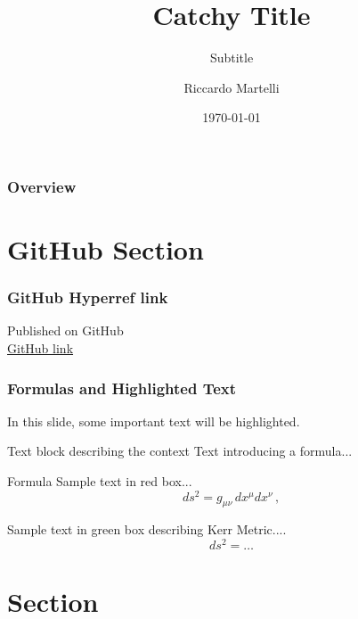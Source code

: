 \documentclass[aspectratio=169,xcolor=dvipsnames]{beamer}
\title{Catchy Title}
\subtitle{Subtitle}
\author{Riccardo Martelli}
\institute
{Institutions}
\date{\today}
\begin{document}
\begin{frame}
    \titlepage
\end{frame}

\begin{frame}
\frametitle{Overview}
    \tableofcontents
\end{frame}

\section{GitHub Section}

\begin{frame}
\frametitle{GitHub Hyperref link}
\centering
    \Huge Published on GitHub\\
    \href{https://github.com/Riccardo-Martelli/Riccardo-Beamer-Theme}{\faGithub GitHub link}
\end{frame}


\begin{frame}
\frametitle{Formulas and Highlighted Text}

    In this slide, some important text will be \alert{highlighted}.

    \begin{block}{Text block describing the context}
        Text introducing a formula...
    \end{block}

    \begin{alertblock}{Formula}
        Sample text in red box...
        \[ds^2 = g_{\mu\nu}\, dx^\mu dx^\nu\,,\]
    \end{alertblock}

    \begin{examples}
        Sample text in green box describing Kerr Metric....
        \[ds^2 = \dots\]
    \end{examples}

    
\end{frame}


\section{Section}
\end{document}
